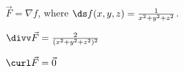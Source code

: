 {$\vec F = \nabla f$, where $\ds f(x,y,z) = \frac1{x^2+y^2+z^2}$.
}
{$\divv \vec F = \frac{2}{(x^2+y^2+z^2)^2}$

$\curl\vec F = \vec 0$
}
